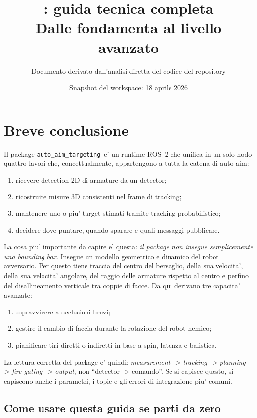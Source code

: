 \documentclass[11pt,a4paper]{article}
\title{\pkg: guida tecnica completa\\
\large Dalle fondamenta al livello avanzato}
\author{Documento derivato dall'analisi diretta del codice del repository}
\date{Snapshot del workspace: 18 aprile 2026}
\newcommand{\pkg}{\texttt{auto\_aim\_targeting}}
\begin{document}
\maketitle
\tableofcontents
\clearpage

\section{Breve conclusione}

Il package \pkg\ e' un runtime ROS~2 che unifica in un solo nodo quattro lavori che, concettualmente, appartengono a tutta la catena di auto-aim:
\begin{enumerate}[leftmargin=1.4em]
  \item ricevere detection 2D di armature da un detector;
  \item ricostruire misure 3D consistenti nel frame di tracking;
  \item mantenere uno o piu' target stimati tramite tracking probabilistico;
  \item decidere dove puntare, quando sparare e quali messaggi pubblicare.
\end{enumerate}

La cosa piu' importante da capire e' questa: \emph{il package non insegue semplicemente una bounding box}. Insegue un modello geometrico e dinamico del robot avversario. Per questo tiene traccia del centro del bersaglio, della sua velocita', della sua velocita' angolare, del raggio delle armature rispetto al centro e perfino del disallineamento verticale tra coppie di facce. Da qui derivano tre capacita' avanzate:
\begin{enumerate}[leftmargin=1.4em]
  \item sopravvivere a occlusioni brevi;
  \item gestire il cambio di faccia durante la rotazione del robot nemico;
  \item pianificare tiri diretti o indiretti in base a spin, latenza e balistica.
\end{enumerate}

La lettura corretta del package e' quindi: \emph{measurement -> tracking -> planning -> fire gating -> output}, non ``detector -> comando''. Se si capisce questo, si capiscono anche i parametri, i topic e gli errori di integrazione piu' comuni.

\subsection{Come usare questa guida se parti da zero}
\end{document}
